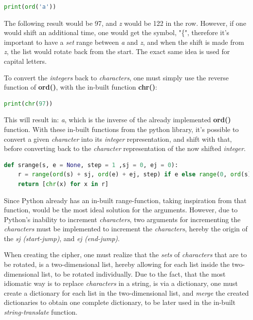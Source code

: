 \documentclass[a4paper,10pt]{article}
\begin{document}
\begin{lstlisting}[language=python]
print(ord('a'))
\end{lstlisting}

The following result would be 97, and \textit{z} would be 122 in the row. However, if one would shift an additional time, one would get the symbol, "\{", therefore it's important to have a \textit{set} range between \textit{a} and \textit{z}, and when the shift is made from \textit{z}, the list would rotate back from the start. The exact same idea is used for capital letters.

To convert the \textit{integers} back to \textit{characters}, one must simply use the reverse function of \textbf{ord()}, with the in-built function \textbf{chr()}:

\begin{lstlisting}[language=python]
print(chr(97))
\end{lstlisting}

This will result in: \textit{a}, which is the inverse of the already implemented \textbf{ord()} function. With these in-built functions from the python library, it's possible to convert a given \textit{character} into its \textit{integer} representation, and shift with that, before converting back to the \textit{character} representation of the now shifted \textit{integer}.

\begin{lstlisting}[language=python]
def srange(s, e = None, step = 1 ,sj = 0, ej = 0):
    r = range(ord(s) + sj, ord(e) + ej, step) if e else range(0, ord(s) + sj, step)
    return [chr(x) for x in r]
\end{lstlisting}

Since Python already has an in-built range-function, taking inspiration from that function, would be the most ideal solution for the arguments.
However, due to Python's inability to increment \textit{characters}, two arguments for incrementing the \textit{characters} must be implemented to increment the \textit{characters}, hereby the origin of the \textit{sj (start-jump)}, and \textit{ej (end-jump)}.


When creating the cipher, one must realize that the \textit{sets} of \textit{characters} that are to be rotated, is a two-dimensional list, hereby allowing for each list inside the two-dimensional list, to be rotated individually. Due to the fact, that the most idiomatic way is to replace \textit{characters} in a string, is via a dictionary, one must create a dictionary for each list in the two-dimensional list, and \textit{merge} the created dictionaries to obtain one complete dictionary, to be later used in the in-built \textit{string-translate} function.
\end{document}

